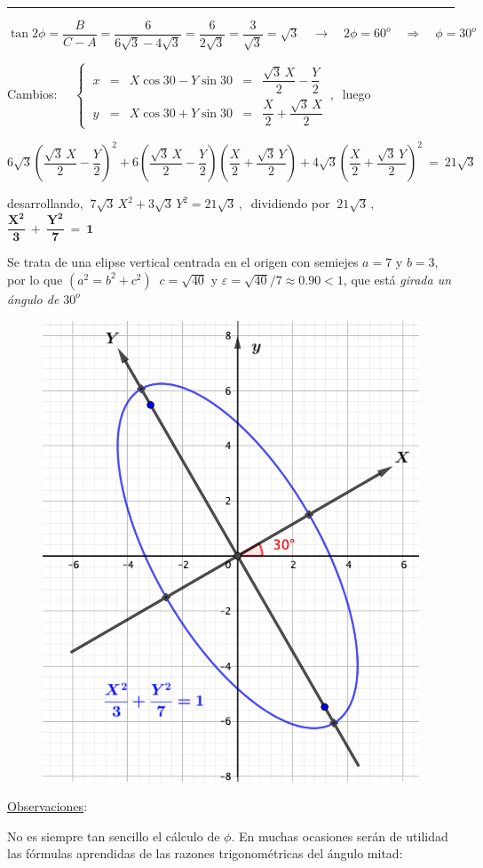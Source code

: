 \rule{250pt}{0.1pt}

$\tan 2\phi=\dfrac{B}{C-A}=\dfrac{6}{6\sqrt{3}-4\sqrt{3}}=\dfrac{6}{2\sqrt{3}}=\dfrac{3}{\sqrt{3}}=\sqrt{3}\quad \to \quad 2\phi=60^o \quad \Rightarrow \quad \phi=30^o$ 

Cambios: $\quad \left\{ \  \begin{array}{lclcl}
 x&=&X\cos 30-Y\sin 30&=&\dfrac{\sqrt{3}\, X}{2}-\dfrac{Y}{2} \\
 y&=&X\cos 30+Y\sin 30&=&\dfrac{X}{2}+	\dfrac{\sqrt{3}\, X}{2}
 \end{array} \right. \, , \  $  luego
 
 $6\sqrt{3} \left( \dfrac{\sqrt{3}\, X}{2} - \dfrac Y 2 \right)^2 +
 6 \left( \dfrac{\sqrt{3}\, X}{2} - \dfrac Y 2 \right) \left(\dfrac X 2 + \dfrac{\sqrt{3}\, Y}{2}  \right) + 4\sqrt{3} \left(\dfrac X 2 + \dfrac{\sqrt{3}\, Y}{2}  \right)^2 \ = \ 21\sqrt{3}$


desarrollando, $\ 7\sqrt{3}\, X^2 +3\sqrt{3}\, Y^2 = 21 \sqrt{3} \, , \  $ dividiendo por $\ 21 \sqrt{3}\, , \quad $
$\boldsymbol{ \dfrac {X^2}{3} \ + \ \dfrac{Y^2}{7} \ = \ 1 } \quad $ 

Se trata de una elipse vertical centrada en el origen con semiejes $a=7$ y $b=3$, por lo que \textcolor{gris}{$(a^2=b^2+c^2)$} $\ c=\sqrt{40}$ y $\varepsilon = \sqrt{40}/7\approx 0.90<1$, que está \emph{girada un ángulo de $30^o$}

\begin{figure}[H]
	\centering
	\includegraphics[width=.5\textwidth]{img-conicas/conicas52.png}
	\end{figure}


\vspace{10mm} \underline{Observaciones}:

No es siempre tan sencillo el cálculo de $\phi$. En muchas ocasiones serán de utilidad las fórmulas aprendidas de las razones trigonométricas del ángulo mitad:

